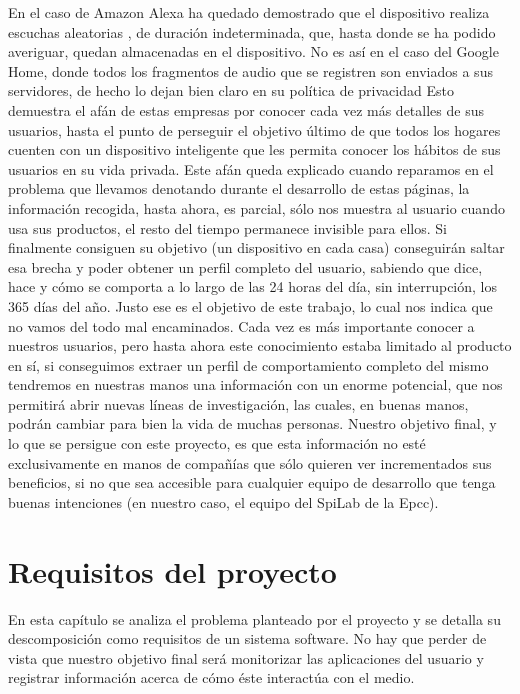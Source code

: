 \documentclass[12pt,a4paper,oneside]{book} %
\begin{document}
\newline
En el caso de Amazon Alexa ha quedado demostrado que el dispositivo realiza escuchas aleatorias \cite{alexaSpy}, de duración indeterminada, que, hasta donde se ha podido averiguar, quedan almacenadas en el dispositivo. No es así en el caso del Google Home, donde todos los fragmentos de audio que se registren son enviados a sus servidores, de hecho lo dejan bien claro en su política de privacidad \cite{GooglePrivacy}
\newline
\newline
Esto demuestra el afán de estas empresas por conocer cada vez más detalles de sus usuarios, hasta el punto de perseguir el objetivo último de que todos los hogares cuenten con un dispositivo inteligente que les permita conocer los hábitos de sus usuarios en su vida privada. 
\newline
\newline
Este afán queda explicado cuando reparamos en el problema que llevamos denotando durante el desarrollo de estas páginas, la información recogida, hasta ahora, es parcial, sólo nos muestra al usuario cuando usa sus productos, el resto del tiempo permanece invisible para ellos. Si finalmente consiguen su objetivo (un dispositivo en cada casa) conseguirán saltar esa brecha y poder obtener un perfil completo del usuario, sabiendo que dice, hace y cómo se comporta a lo largo de las 24 horas del día, sin interrupción, los 365 días del año. 
\newline
\newline
Justo ese es el objetivo de este trabajo, lo cual nos indica que no vamos del todo mal encaminados. Cada vez es más importante conocer a nuestros usuarios, pero hasta ahora este conocimiento estaba limitado al producto en sí, si conseguimos extraer un perfil de comportamiento completo del mismo tendremos en nuestras manos una información con un enorme potencial, que nos permitirá abrir nuevas líneas de investigación, las cuales, en buenas manos, podrán cambiar para bien la vida de muchas personas. 
\newline
\newline
Nuestro objetivo final, y lo que se persigue con este proyecto, es que esta información no esté exclusivamente en manos de compañías que sólo quieren ver incrementados sus beneficios, si no que sea accesible para cualquier equipo de desarrollo que tenga buenas intenciones (en nuestro caso, el equipo del SpiLab de la Epcc). 
\newpage
\chapter{Requisitos del proyecto}
En esta capítulo se analiza el problema planteado por el proyecto y se detalla su descomposición como requisitos de un sistema software. No hay que perder de vista que nuestro objetivo final será monitorizar las aplicaciones del usuario y registrar información acerca de cómo éste interactúa con el medio.
\newpage
\end{document}
